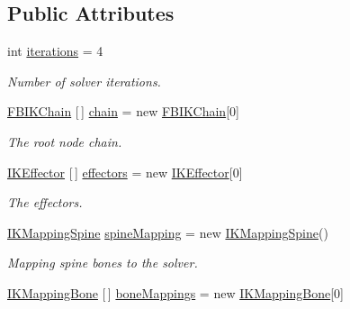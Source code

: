 \subsection*{Public Attributes}
\begin{DoxyCompactItemize}
\item 
int \mbox{\hyperlink{class_root_motion_1_1_final_i_k_1_1_i_k_solver_full_body_a1c5503fc656cad2bdb10bfc511760424}{iterations}} = 4
\begin{DoxyCompactList}\small\item\em Number of solver iterations. \end{DoxyCompactList}\item 
\mbox{\hyperlink{class_root_motion_1_1_final_i_k_1_1_f_b_i_k_chain}{F\+B\+I\+K\+Chain}} \mbox{[}$\,$\mbox{]} \mbox{\hyperlink{class_root_motion_1_1_final_i_k_1_1_i_k_solver_full_body_aae6ec635c069329275bd5e3eb18dac41}{chain}} = new \mbox{\hyperlink{class_root_motion_1_1_final_i_k_1_1_f_b_i_k_chain}{F\+B\+I\+K\+Chain}}\mbox{[}0\mbox{]}
\begin{DoxyCompactList}\small\item\em The root node chain. \end{DoxyCompactList}\item 
\mbox{\hyperlink{class_root_motion_1_1_final_i_k_1_1_i_k_effector}{I\+K\+Effector}} \mbox{[}$\,$\mbox{]} \mbox{\hyperlink{class_root_motion_1_1_final_i_k_1_1_i_k_solver_full_body_add899bb83ac8a5c74bacaa9463bfd0cc}{effectors}} = new \mbox{\hyperlink{class_root_motion_1_1_final_i_k_1_1_i_k_effector}{I\+K\+Effector}}\mbox{[}0\mbox{]}
\begin{DoxyCompactList}\small\item\em The effectors. \end{DoxyCompactList}\item 
\mbox{\hyperlink{class_root_motion_1_1_final_i_k_1_1_i_k_mapping_spine}{I\+K\+Mapping\+Spine}} \mbox{\hyperlink{class_root_motion_1_1_final_i_k_1_1_i_k_solver_full_body_a29f95d9ab15bf68b734d1b3e092571c3}{spine\+Mapping}} = new \mbox{\hyperlink{class_root_motion_1_1_final_i_k_1_1_i_k_mapping_spine}{I\+K\+Mapping\+Spine}}()
\begin{DoxyCompactList}\small\item\em Mapping spine bones to the solver. \end{DoxyCompactList}\item 
\mbox{\hyperlink{class_root_motion_1_1_final_i_k_1_1_i_k_mapping_bone}{I\+K\+Mapping\+Bone}} \mbox{[}$\,$\mbox{]} \mbox{\hyperlink{class_root_motion_1_1_final_i_k_1_1_i_k_solver_full_body_a5c0dfff5a382d7386bfe163ecdee1410}{bone\+Mappings}} = new \mbox{\hyperlink{class_root_motion_1_1_final_i_k_1_1_i_k_mapping_bone}{I\+K\+Mapping\+Bone}}\mbox{[}0\mbox{]}

\end{DoxyCompactItemize}
